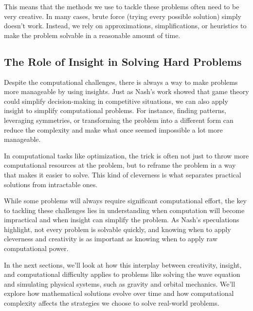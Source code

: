 This means that the methods we use to tackle these problems often need to be very creative. In many cases, brute force (trying every possible solution) simply doesn’t work. Instead, we rely on approximations, simplifications, or heuristics to make the problem solvable in a reasonable amount of time.

\subsection{The Role of Insight in Solving Hard Problems}

Despite the computational challenges, there is always a way to make problems more manageable by using insights. Just as Nash’s work showed that game theory could simplify decision-making in competitive situations, we can also apply insight to simplify computational problems. For instance, finding patterns, leveraging symmetries, or transforming the problem into a different form can reduce the complexity and make what once seemed impossible a lot more manageable.

In computational tasks like optimization, the trick is often not just to throw more computational resources at the problem, but to reframe the problem in a way that makes it easier to solve. This kind of cleverness is what separates practical solutions from intractable ones.

While some problems will always require significant computational effort, the key to tackling these challenges lies in understanding when computation will become impractical and when insight can simplify the problem. As Nash’s speculations highlight, not every problem is solvable quickly, and knowing when to apply cleverness and creativity is as important as knowing when to apply raw computational power.

In the next sections, we’ll look at how this interplay between creativity, insight, and computational difficulty applies to problems like solving the wave equation and simulating physical systems, such as gravity and orbital mechanics. We’ll explore how mathematical solutions evolve over time and how computational complexity affects the strategies we choose to solve real-world problems.

